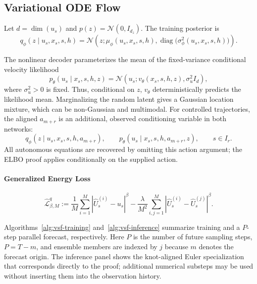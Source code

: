 \subsection{Variational ODE Flow}
Let $d=\dim(u_s)$ and $p(z)=\mathcal N(0,I_{d_z})$.  The training posterior is
\begin{equation}
  q_\phi(z\mid u_s,x_s,s,h)
  =\mathcal N\!\left(
    z;
    \mu_\phi(u_s,x_s,s,h),
    \operatorname{diag}\!\bigl(\sigma_\phi^2(u_s,x_s,s,h)\bigr)
  \right).
  \label{eq:method-variational-posterior}
\end{equation}

The nonlinear decoder parameterizes the mean of the fixed-variance conditional
velocity likelihood
\begin{equation}
  p_\theta(u_s\mid x_s,s,h,z)
  =\mathcal N\!\left(
    u_s;
    v_\theta(x_s,s,h,z),
    \sigma_u^2 I_d
  \right),
  \label{eq:method-velocity-likelihood}
\end{equation}
where $\sigma_u^2>0$ is fixed.  Thus, conditional on $z$, $v_\theta$
deterministically predicts the likelihood mean.  Marginalizing the random
latent gives a Gaussian location mixture, which can be non-Gaussian and
multimodal.
For controlled trajectories, the aligned $a_{m+r}$ is an additional,
observed conditioning variable in both networks:
\begin{equation}
  q_\phi(z\mid u_s,x_s,s,h,a_{m+r}),
  \qquad
  p_\theta(u_s\mid x_s,s,h,a_{m+r},z),
  \qquad s\in I_r.
  \label{eq:method-controlled-conditionals}
\end{equation}
All autonomous equations are recovered by omitting this action argument; the
ELBO proof applies conditionally on the supplied action.


\paragraph{Generalized Energy Loss}
\begin{equation}
  \widehat{\mathcal L}_{\beta,M}^{q}
  :=\frac1M\sum_{i=1}^M
       \left|\widehat U_s^{(i)}-u_s\right|^\beta
    -\frac{\lambda}{M^2}\sum_{i,j=1}^M
       \left|\widehat U_s^{(i)}-\widehat U_s^{(j)}\right|^\beta.
  \label{eq:generalized_crps_training_loss}
\end{equation}


Algorithms~\ref{alg:vsf-training} and~\ref{alg:vsf-inference} summarize
training and a $P$-step parallel forecast, respectively.  Here $P$ is the
number of future sampling steps, $P=T-m$,
and ensemble members are indexed by $j$ because $m$ denotes the forecast
origin.  The inference panel shows the knot-aligned Euler specialization that
corresponds directly to the proof; additional numerical substeps may be used
without inserting them into the observation history.

